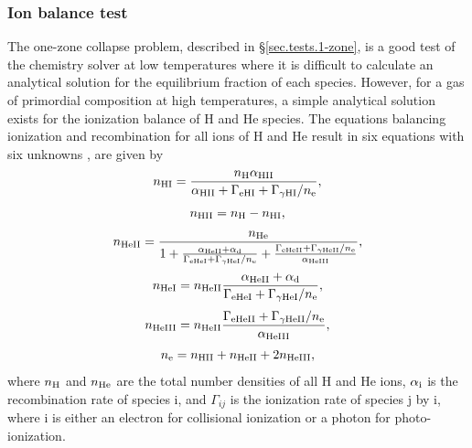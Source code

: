 \subsubsection{Ion balance test}
\label{sec.tests.ionbalance}

The one-zone collapse problem, described in \S\ref{sec.tests.1-zone},
is a good test of the chemistry solver at low temperatures where it is
difficult to calculate an analytical solution for the equilibrium
fraction of each species.  However, for a gas of primordial composition
at high temperatures, a simple analytical solution exists for the
ionization balance of H and He species.  The equations balancing
ionization and recombination for all ions of H and He result in six
equations with six unknowns \citep[e.g.,][]{1996ApJS..105...19K}, are
given by
\begin{equation} \label{eq:eqnHI}
n_{\rm HI} = \frac{n_{\rm H} \alpha_{\rm HII}}{\alpha_{\rm HII}
+ \Gamma_{\rm eHI} + \Gamma_{\gamma \rm HI} / n_{\rm e}},
\end{equation}
\begin{equation}
n_{\rm HII} = n_{\rm H} - n_{\rm HI},
\end{equation}
\begin{equation}
n_{\rm HeII} = \frac{n_{\rm He}}{1 + \frac{\alpha_{\rm HeII}
+ \alpha_{\rm d}}{\Gamma_{\rm eHeI} + \Gamma_{\gamma \rm HeI} / n_{\rm
e}} + \frac{\Gamma_{\rm eHeII} + \Gamma_{\gamma \rm HeII} / n_{\rm
e}}{\alpha_{\rm HeIII}}},
\end{equation}
\begin{equation}
n_{\rm HeI} = n_{\rm HeII} \frac{\alpha_{\rm HeII} + \alpha_{\rm
d}}{\Gamma_{\rm eHeI} + \Gamma_{\gamma \rm HeI} / n_{\rm e}},
\end{equation}
\begin{equation}
n_{\rm HeIII} = n_{\rm HeII} \frac{\Gamma_{\rm eHeII}
+ \Gamma_{\rm \gamma \rm HeII} / n_{\rm e}}{\alpha_{\rm HeIII}},
\end{equation}
\begin{equation} \label{eq:eqne}
n_{\rm e} = n_{\rm HII} + n_{\rm HeII} + 2 n_{\rm HeIII},
\end{equation}
where $n_{\rm H}$ and $n_{\rm He}$ are the total number densities of
all H and He ions, $\alpha_{\rm i}$ is the recombination rate of
species i, and $\Gamma_{ij}$ is the ionization rate of species j by
i, where i is either an electron for collisional ionization or a
photon for photo-ionization.

